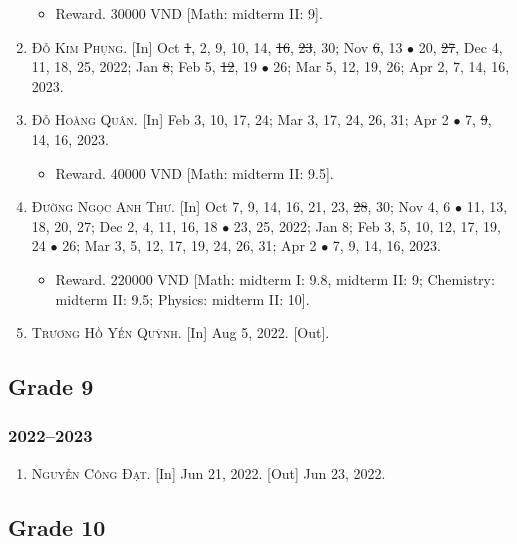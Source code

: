 \documentclass{article}
\begin{document}
\begin{enumerate}
	\begin{itemize}
		\item \textsf{Reward.} 30000 VND [Math: midterm II: 9].
	\end{itemize}
	\item \textsc{Đỗ Kim Phụng.} \textsf{[In]} Oct \st{1}, 2, 9, 10, 14, \st{16}, \st{23}, 30; Nov \st{6}, 13 $\bullet$ 20, \st{27}, Dec 4, 11, 18, 25, 2022; Jan \st{8}; Feb 5, \st{12}, 19 $\bullet$ 26; Mar 5, 12, 19, 26; Apr 2, 7, 14, 16, 2023.
	\item \textsc{Đỗ Hoàng Quân.} \textsf{[In]} Feb 3, 10, 17, 24; Mar 3, 17, 24, 26, 31; Apr 2 $\bullet$ 7, \st{9}, 14, 16, 2023.
	\begin{itemize}
		\item \textsf{Reward.} 40000 VND [Math: midterm II: 9.5].
	\end{itemize}
	\item \textsc{Đường Ngọc Anh Thư.} \textsf{[In]} Oct 7, 9, 14, 16, 21, 23, \st{28}, 30; Nov 4, 6 $\bullet$ 11, 13, 18, 20, 27; Dec 2, 4, 11, 16, 18 $\bullet$ 23, 25, 2022; Jan 8; Feb 3, 5, 10, 12, 17, 19, 24 $\bullet$ 26; Mar 3, 5, 12, 17, 19, 24, 26, 31; Apr 2 $\bullet$ 7, 9, 14, 16, 2023.
	\begin{itemize}
		\item \textsf{Reward.} 220000 VND [Math: midterm I: 9.8, midterm II: 9; Chemistry: midterm II: 9.5; Physics: midterm II: 10].
	\end{itemize}
	\item \textsc{Trương Hồ Yến Quỳnh.} \textsf{[In]} Aug 5, 2022. \textsf{[Out]}.
\end{enumerate}

\subsection{Grade 9}

\subsubsection{2022--2023}

\begin{enumerate}
	\item \textsc{Nguyễn Công Đạt.} \textsf{[In]} Jun 21, 2022. \textsf{[Out]} Jun 23, 2022.
\end{enumerate}

\subsection{Grade 10}
\end{document}

